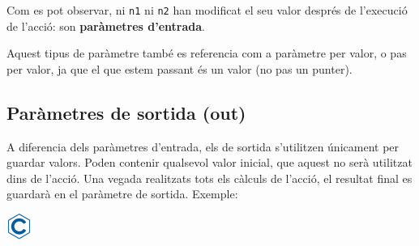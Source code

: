 \documentclass[]{book}
\newenvironment{Shaded}{\begin{snugshade}}{\end{snugshade}}
\newcommand{\DataTypeTok}[1]{\textcolor[rgb]{0.13,0.29,0.53}{#1}}
\newcommand{\DecValTok}[1]{\textcolor[rgb]{0.00,0.00,0.81}{#1}}
\newcommand{\SpecialCharTok}[1]{\textcolor[rgb]{0.00,0.00,0.00}{#1}}
\newcommand{\StringTok}[1]{\textcolor[rgb]{0.31,0.60,0.02}{#1}}
\newcommand{\ImportTok}[1]{#1}
\newcommand{\CommentTok}[1]{\textcolor[rgb]{0.56,0.35,0.01}{\textit{#1}}}
\newcommand{\ControlFlowTok}[1]{\textcolor[rgb]{0.13,0.29,0.53}{\textbf{#1}}}
\newcommand{\PreprocessorTok}[1]{\textcolor[rgb]{0.56,0.35,0.01}{\textit{#1}}}
\newcommand{\NormalTok}[1]{#1}
\begin{document}
Com es pot observar, ni \texttt{n1} ni \texttt{n2} han modificat el seu
valor després de l'execució de l'acció: son \textbf{paràmetres
d'entrada}.

Aquest tipus de paràmetre també es referencia com a paràmetre per valor,
o pas per valor, ja que el que estem passant és un valor (no pas un
punter).

\subsection{Paràmetres de sortida
(out)}\label{parametres-de-sortida-out}

A diferencia dels paràmetres d'entrada, els de sortida s'utilitzen
únicament per guardar valors. Poden contenir qualsevol valor inicial,
que aquest no serà utilitzat dins de l'acció. Una vegada realitzats tots
els càlculs de l'acció, el resultat final es guardarà en el paràmetre de
sortida. Exemple:

\includegraphics{./img/c.png}

\begin{Shaded}
\end{Shaded}
\end{document}
